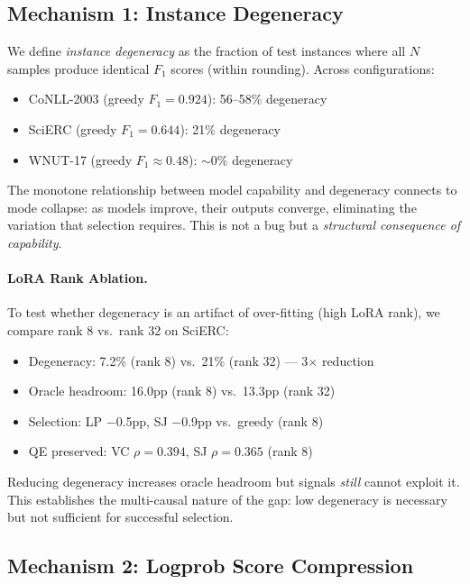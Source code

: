 \documentclass[11pt]{article}
\begin{document}
\subsection{Mechanism 1: Instance Degeneracy}

We define \emph{instance degeneracy} as the fraction of test instances where all $N$ samples produce identical $F_1$ scores (within rounding). Across configurations:

\begin{itemize}
\item CoNLL-2003 (greedy $F_1 = 0.924$): 56--58\% degeneracy
\item SciERC (greedy $F_1 = 0.644$): 21\% degeneracy
\item WNUT-17 (greedy $F_1 \approx 0.48$): $\sim$0\% degeneracy
\end{itemize}

The monotone relationship between model capability and degeneracy connects to mode collapse: as models improve, their outputs converge, eliminating the variation that selection requires. This is not a bug but a \emph{structural consequence of capability}.

\paragraph{LoRA Rank Ablation.} To test whether degeneracy is an artifact of over-fitting (high LoRA rank), we compare rank 8 vs.\ rank 32 on SciERC:

\begin{itemize}
\item Degeneracy: 7.2\% (rank 8) vs.\ 21\% (rank 32) --- 3$\times$ reduction
\item Oracle headroom: 16.0pp (rank 8) vs.\ 13.3pp (rank 32)
\item Selection: LP $-$0.5pp, SJ $-$0.9pp vs.\ greedy (rank 8)
\item QE preserved: VC $\rho = 0.394$, SJ $\rho = 0.365$ (rank 8)
\end{itemize}

Reducing degeneracy increases oracle headroom but signals \emph{still} cannot exploit it. This establishes the multi-causal nature of the gap: low degeneracy is necessary but not sufficient for successful selection.

\subsection{Mechanism 2: Logprob Score Compression}
\end{document}
